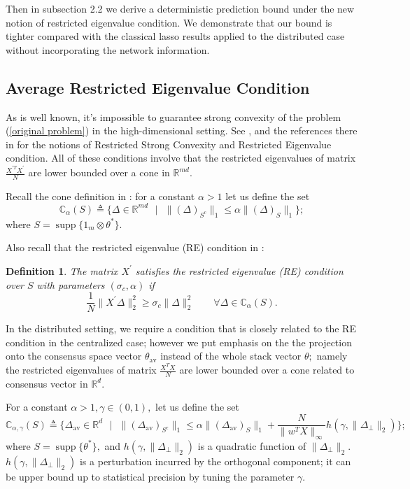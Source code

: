 \documentclass{article}
\theoremstyle{break}
\newtheorem{definition}{Definition}
\newcommand{\T}{\theta}
\DeclareMathOperator\supp{supp}
\begin{document}
Then in subsection 2.2 we derive a deterministic prediction bound under the new notion of restricted eigenvalue condition. We demonstrate that our bound is tighter compared with the classical lasso results applied to the distributed case without incorporating the network information.
\subsection{Average Restricted Eigenvalue Condition }

As is well known, it's impossible to  guarantee strong convexity of the problem (\ref{original problem}) in the high-dimensional setting. See \cite{agarwal2011fast}, \cite{Ras} and the references there in for the notions of Restricted Strong Convexity and Restricted Eigenvalue condition. All of these conditions involve that the restricted eigenvalues of matrix $\frac{X^{'T}X^{'}}{N}$ are lower bounded over a cone in $\mathbb{R}^{md}.$
 
Recall the cone definition in  \cite{Ras}: for a constant $\alpha>1$ let us define the set
\begin{equation}
    \mathbb{C}_{\alpha}(S)\triangleq\{\Delta\in\mathbb{R}^{md}\text{ }|\text{ }\lVert (\Delta)_{S^c}\rVert_1\leq\alpha\lVert (\Delta)_{S}\rVert_1\};
\end{equation}
where $S=\supp\{1_m\otimes\T^*\}.$

Also recall that the restricted eigenvalue (RE) condition in \cite{Ras}:
\begin{definition}
  The matrix $X^{'}$ satisfies the restricted eigenvalue 
 (RE) condition over $S$ with parameters $(\sigma_c,\alpha)$ if 
\begin{equation}\label{AVE}
    \frac{1}{N}\lVert X^{'}\Delta\rVert_2^2\geq \sigma_c\lVert\Delta\rVert_2^2\qquad \forall \Delta\in\mathbb{C}_{\alpha}(S).
\end{equation}
\end{definition}

In the distributed setting, we require a condition that is closely related to the RE condition in the centralized case; however we put emphasis on the the projection onto the consensus space vector $\T_{\text{av}}$ instead of the whole stack vector $\T;$ namely the restricted eigenvalues of matrix $\frac{X^{T}X^{}}{N}$ are lower bounded over a cone related to consensus vector in $\mathbb{R}^{d}.$
 
 For a constant $\alpha>1,\gamma\in(0,1),$ let us define the set
\begin{equation}
    \mathbb{C}_{\alpha,\gamma}(S)\triangleq\{\Delta_{\text{av}}\in\mathbb{R}^d\text{ }|\text{ }\lVert (\Delta_{\text{av}})_{S^c}\rVert_1\leq\alpha\lVert (\Delta_{\text{av}})_{S}\rVert_1+\frac{N}{\lVert w^TX\rVert_{\infty}} h(\gamma,\lVert\Delta_{\perp}\rVert_2)\};
\end{equation}
where $S=\supp\{\T^*\},$ and $h(\gamma,\lVert\Delta_{\perp}\rVert_2)$ is a quadratic function of $\lVert\Delta_{\perp}\rVert_2.$ $h(\gamma,\lVert\Delta_{\perp}\rVert_2)$ is a perturbation incurred by the orthogonal component;  it can be upper bound up to statistical precision by tuning the parameter $\gamma.$ 
\end{document}
